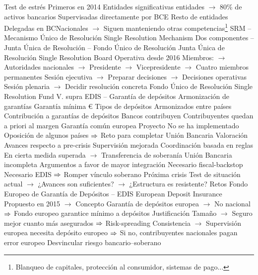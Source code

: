 \documentclass{nuevotema}
\begin{document}
\begin{esquemal}
				\4 Test de estrés
				\4[] Primeros en 2014
				\4 Entidades significativas
				 entidades
				\4[] $\to$ 80\% de activos bancarios
				\4[] Supervisadas directamente por BCE
				\4 Resto de entidades
				\4[] Delegadas en BCNacionales
				\4[] $\to$ Siguen manteniendo otras competencias\footnote{Blanqueo de capitales, protección al consumidor, sistemas de pago...}
			\3 SRM -- Mecanismo Único de Resolución
				\4 Single Resolution Mechanism
				\4 Dos componentes
				\4[] -- Junta Única de Resolución
				\4[] -- Fondo Único de Resolución
				\4 Junta Única de Resolución
				\4[] Single Resolution Board
				\4[] Operativa desde 2016
				\4[] Miembros:
				\4[] $\to$ Autoridades nacionales
				\4[] $\to$ Presidente
				\4[] $\to$ Vicepresidente
				\4[] $\to$ Cuatro miembros permanentes
				\4[] Sesión ejecutiva
				\4[] $\to$ Preparar decisiones
				\4[] $\to$ Decisiones operativas
				\4[] Sesión plenaria
				\4[] $\to$ Decidir resolución concreta
				\4 Fondo Único de Resolución
				\4[] Single Resolution Fund
				\4[] V. supra
			\3 EDIS -- Garantía de depósitos
				\4 Armonización de garantías
				\4 Garantía mínima
				\4[] 100.000 €
				\4 Tipos de depósitos
				\4[] Armonizados entre países
				\4 Contribución a garantías de depósitos
				\4[] Bancos contribuyen
				\4[] Contribuyentes quedan a priori al margen
				\4 Garantía común europea
				\4[] Proyecto
				\4[] No se ha implementado
				\4[] Oposición de algunos países
				\4[] $\Rightarrow$ Reto para completar Unión Bancaria
		\2 Valoración
			\3 Avances respecto a pre-crisis
				\4 Supervisión mejorada
				\4 Coordinación basada en reglas
				\4[] En cierta medida superada
				\4[] $\to$ Transferencia de soberanía
			\3 Unión Bancaria incompleta
				\4 Argumentos a favor de mayor integración
				\4[] Necesario fiscal-backstop
				\4[] Necesario EDIS
				\4[] $\Rightarrow$ Romper vínculo soberano
			\3 Próxima crisis
				\4 Test de situación actual
				\4[] $\to$ ¿Avances son suficientes?
				\4[] $\to$ ¿Estructura es resistente?
		\2 Retos
			\3 Fondo Europeo de Garantía de Depósitos -- EDIS
				\4 European Deposit Insurance
				\4[] Propuesto en 2015
				\4[] $\to$
				\4 Concepto
				\4[] Garantía de depósitos europea
				\4[] $\to$ No nacional
				\4[] $\Rightarrow$ Fondo europeo garantice mínimo a depósitos
				\4 Justificación
				\4[] Tamaño
				\4[] $\to$ Seguro mejor cuanto más asegurados
				\4[] $\Rightarrow$ Risk-spreading
				\4[] Consistencia
				\4[] $\to$ Supervisión europea necesita depósito europeo
				\4[] $\Rightarrow$ Si no, contribuyentes nacionales pagan error europeo
				\4[] Desvincular riesgo bancario--soberano

\end{esquemal}
\end{document}
